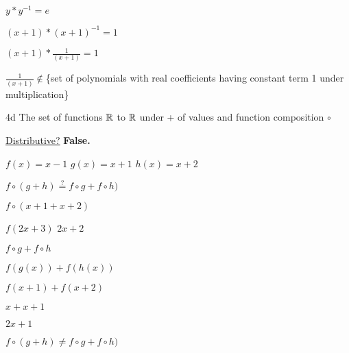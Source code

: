 $y * y^{-1} = e$

$(x+1) * (x+1)^{-1} = 1$

$(x+1) * \frac{1}{(x+1)} = 1$

$\frac{1}{(x+1)} \notin $\{set of polynomials with real coefficients having constant term 1 under multiplication\}


\begin{question}{4d}
The set of functions $\mathbb{R}$ to $\mathbb{R}$ under + of values and function composition $\circ$
\end{question}

\underline{Distributive?} \textbf{False.}

$f(x) = x-1$
$g(x) = x+1$
$h(x) = x+2$

$f \circ (g+h) \stackrel{?}{=} f \circ g + f \circ h)$

$f \circ (x+1+x+2)$

$f(2x+3)$
$2x+2$

$f \circ g + f \circ h$

$f(g(x)) + f(h(x))$

$f(x+1) + f(x+2)$

$x + x+1$

$2x+1$

$f \circ (g+h) \neq f \circ g + f \circ h)$

